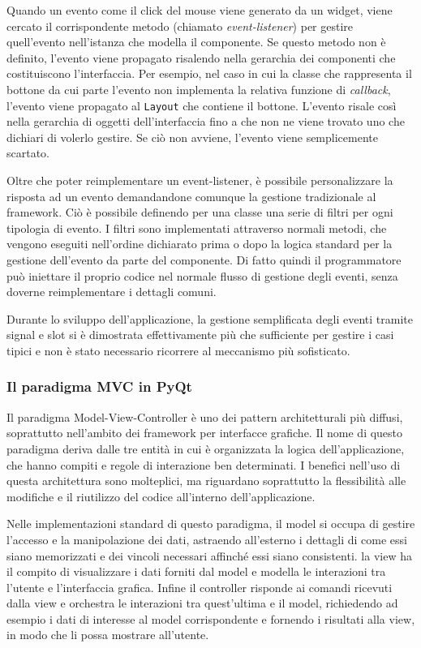 Quando un evento come il click del mouse viene generato da un widget, viene cercato il corrispondente metodo (chiamato \emph{event-listener}) per gestire quell'evento nell'istanza che modella il componente. Se questo metodo non è definito, l'evento viene propagato risalendo nella gerarchia dei componenti che costituiscono l'interfaccia. Per esempio, nel caso in cui la classe che rappresenta il bottone da cui parte l'evento non implementa la relativa funzione di \emph{callback}, l'evento viene propagato al \verb|Layout| che contiene il bottone. L'evento risale così nella gerarchia di oggetti dell'interfaccia fino a che non ne viene trovato uno che dichiari di volerlo gestire. Se ciò non avviene, l'evento viene semplicemente scartato. 

Oltre che poter reimplementare un event-listener, è possibile personalizzare la risposta ad un evento demandandone comunque la gestione tradizionale al framework. Ciò è possibile definendo per una classe una serie di filtri per ogni tipologia di evento. I filtri sono implementati attraverso normali metodi, che vengono eseguiti nell'ordine dichiarato prima o dopo la logica standard per la gestione dell'evento da parte del componente. Di fatto quindi il programmatore può iniettare il proprio codice nel normale flusso di gestione degli eventi, senza doverne reimplementare i dettagli comuni.

Durante lo sviluppo dell'applicazione, la gestione semplificata degli eventi tramite signal e slot si è dimostrata effettivamente più che sufficiente per gestire i casi tipici e non è stato necessario ricorrere al meccanismo più sofisticato.

\subsubsection{Il paradigma MVC in PyQt}

Il paradigma Model-View-Controller è uno dei pattern architetturali più diffusi, soprattutto nell'ambito dei framework per interfacce grafiche. Il nome di questo paradigma deriva dalle tre entità in cui è organizzata la logica dell'applicazione, che hanno  compiti e regole di interazione ben determinati. I benefici nell'uso di questa architettura sono molteplici, ma riguardano soprattutto la flessibilità alle modifiche e il riutilizzo del codice all'interno dell'applicazione. 

Nelle implementazioni standard di questo paradigma, il model si occupa di gestire l'accesso e la manipolazione dei dati, astraendo all'esterno i dettagli di come essi siano memorizzati e dei vincoli necessari affinché essi siano consistenti.
la view ha il compito di visualizzare i dati forniti dal model e modella le interazioni tra l'utente e l'interfaccia grafica. Infine il controller risponde  ai comandi ricevuti dalla view e orchestra le interazioni tra quest'ultima e il model, richiedendo ad esempio i dati di interesse al model corrispondente e fornendo i risultati alla view, in modo che li possa mostrare all'utente.

